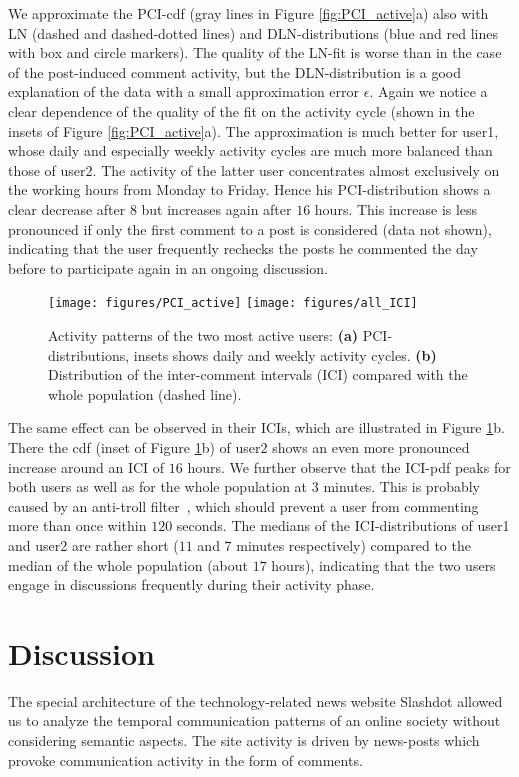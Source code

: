 \documentclass[twoside,11pt]{article}
\begin{document}
We approximate the PCI-cdf (gray lines in Figure
\ref{fig:PCI_active}a) also with LN (dashed and dashed-dotted lines)
and DLN-distributions (blue and red lines with box and circle
markers). The quality of the LN-fit is worse than in the case of the
post-induced comment activity, but the DLN-distribution is a good
explanation of the data with a small approximation error $\epsilon$.
Again we notice a clear dependence of the quality of the fit on the
activity cycle (shown in the insets of Figure \ref{fig:PCI_active}a).
The approximation is much better for user1, whose daily and especially
weekly activity cycles are much more balanced than those of user2. The
activity of the latter user concentrates almost exclusively on the
working hours from Monday to Friday.  Hence his PCI-distribution shows
a clear decrease after $8$ but increases again after $16$ hours. This
increase is less pronounced if only the first comment to a post is
considered (data not shown), indicating that the user frequently
rechecks the posts he commented the day before to participate again in
an ongoing discussion.

\begin{figure}[!t]\centering
  \texttt{[image: figures/PCI\_active]}
  \texttt{[image: figures/all\_ICI]}
  \caption{Activity patterns of the two most active users:
    \textbf{(a)} PCI-distributions, insets shows daily and weekly
    activity cycles.  
    \textbf{(b)} Distribution of the inter-comment intervals (ICI)
    compared with the whole population (dashed line).}
\label{fig:PCI_active}
\label{fig:ICI_active}
\end{figure}

The same effect can be observed in their ICIs, which are illustrated
in Figure \ref{fig:ICI_active}b.  There the cdf (inset of Figure
\ref{fig:ICI_active}b) of user$2$ shows an even more pronounced
increase around an ICI of $16$ hours. We further observe that the
ICI-pdf peaks for both users as well as for the whole population at
$3$ minutes. This is probably caused by an anti-troll
filter~\citep{SlashdotFAQ}, which should prevent a user from commenting
more than once within $120$ seconds.  The medians of the
ICI-distributions of user1 and user2 are rather short ($11$ and $7$
minutes respectively) compared to the median of the whole population
(about $17$ hours), indicating that the two users engage in
discussions frequently during their activity phase.

\section{Discussion}
\label{sec:discussion}\noindent
The special architecture of the technology-related news website
Slashdot allowed us to analyze the temporal communication patterns of
an online society without considering semantic aspects. The site
activity is driven by news-posts which provoke communication activity
in the form of comments.
\end{document}
